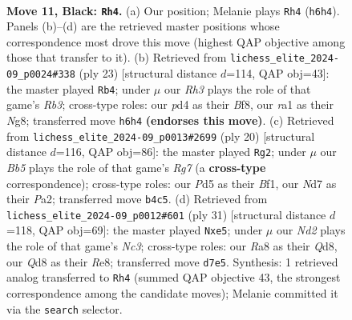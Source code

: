 \documentclass[11pt]{article}
\begin{document}
\clearpage

\begin{figure}[p]\centering
\begin{subfigure}{0.46\textwidth}\centering
\resizebox{\linewidth}{!}{%
\newchessgame
\chessboard[
  setfen={r1bqk3/pp1n1pp1/2n1p2r/3pP3/Qb1P4/5P2/PP1N2PP/R1B1K1NR b KQq - 4 11},
  showmover=false,
  pgfstyle=straightmove, color=movearrow, markmove={h6-h4}
]}
\caption{}
\end{subfigure}\hfill
\begin{subfigure}{0.46\textwidth}\centering
\resizebox{\linewidth}{!}{%
\newchessgame
\chessboard[
  setfen={3qkbnr/p1pn2pp/1r3p2/3Pp3/Q1P3b1/4PNP1/PP4BP/RNB1K2R b KQk - 4 12},
  showmover=false,
  pgfstyle=straightmove, color=movearrow, markmove={b6-b4}
]}
\caption{}
\end{subfigure}
\\[4pt]
\begin{subfigure}{0.46\textwidth}\centering
\resizebox{\linewidth}{!}{%
\newchessgame
\chessboard[
  setfen={r1b1k2r/pp1n1pRp/2p1pq2/3p4/2PP4/2N1P3/PPQ2P1b/R1B1KB2 w Qkq - 1 11},
  showmover=false,
  pgfstyle=straightmove, color=movearrow, markmove={g7-g2}
]}
\caption{}
\end{subfigure}\hfill
\begin{subfigure}{0.46\textwidth}\centering
\resizebox{\linewidth}{!}{%
\newchessgame
\chessboard[
  setfen={r1bqr1k1/1p1p1p2/p1nb1n2/4P1B1/3P1p2/P1PB4/6PP/RN1QR1K1 b - - 0 16},
  showmover=false,
  pgfstyle=straightmove, color=movearrow, markmove={c6-e5}
]}
\caption{}
\end{subfigure}
\caption{\textbf{Move 11, Black: \texttt{Rh4}.} (a) Our position; Melanie plays \texttt{Rh4} (\texttt{h6h4}). Panels (b)--(d) are the retrieved master positions whose correspondence most drove this move (highest QAP objective among those that transfer to it). (b) Retrieved from \texttt{lichess\_elite\_2024-09\_p0024\#338} (ply 23) [structural distance $d$=114, QAP obj=43]: the master played \texttt{Rb4}; under $\mu$ our \emph{Rh3} plays the role of that game's \emph{Rb3}; cross-type roles: our \emph{p}d4 as their \emph{B}f8, our \emph{r}a1 as their \emph{N}g8; transferred move \texttt{h6h4} \textbf{(endorses this move)}. (c) Retrieved from \texttt{lichess\_elite\_2024-09\_p0013\#2699} (ply 20) [structural distance $d$=116, QAP obj=86]: the master played \texttt{Rg2}; under $\mu$ our \emph{Bb5} plays the role of that game's \emph{Rg7} (a \textbf{cross-type} correspondence); cross-type roles: our \emph{P}d5 as their \emph{B}f1, our \emph{N}d7 as their \emph{P}a2; transferred move \texttt{b4c5}. (d) Retrieved from \texttt{lichess\_elite\_2024-09\_p0012\#601} (ply 31) [structural distance $d$=118, QAP obj=69]: the master played \texttt{Nxe5}; under $\mu$ our \emph{Nd2} plays the role of that game's \emph{Nc3}; cross-type roles: our \emph{R}a8 as their \emph{Q}d8, our \emph{Q}d8 as their \emph{R}e8; transferred move \texttt{d7e5}. Synthesis: 1 retrieved analog transferred to \texttt{Rh4} (summed QAP objective 43, the strongest correspondence among the candidate moves); Melanie committed it via the \texttt{search} selector.}
\label{fig:thought-m21}
\end{figure}
\end{document}
